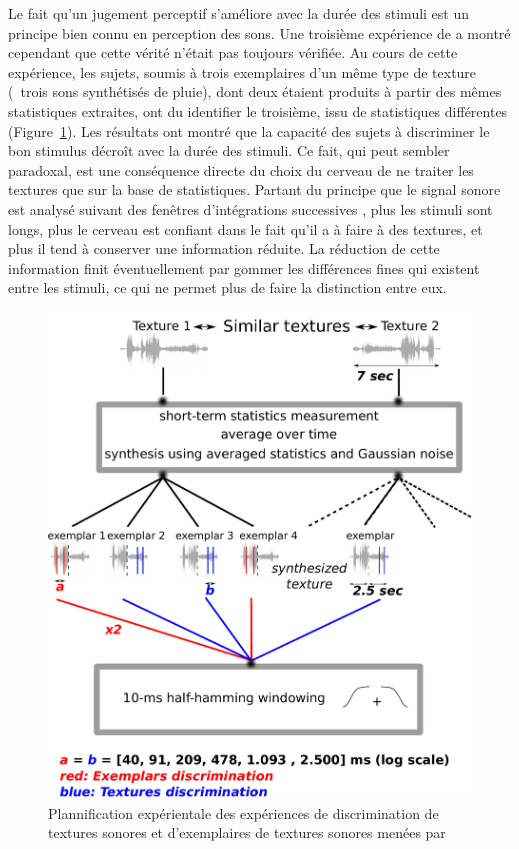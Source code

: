 Le fait qu'un jugement perceptif s'améliore avec la durée des stimuli est un principe bien connu en perception des sons\citep{moore1973frequency}. Une troisième expérience de \citep{mcdermott2013summary} a montré cependant que cette vérité n'était pas toujours vérifiée. Au cours de cette expérience, les sujets, soumis à trois exemplaires d'un même type de texture (\eg~trois sons synthétisés de pluie), dont deux étaient produits à partir des mêmes statistiques extraites, ont du identifier le troisième, issu de statistiques différentes (Figure~\ref{fig:textureMcder}). Les résultats ont montré que la capacité des sujets à discriminer le bon stimulus décroît avec la durée des stimuli. Ce fait, qui peut sembler paradoxal, est une conséquence directe du choix du cerveau de ne traiter les textures que sur la base de statistiques. Partant du principe que le signal sonore est analysé suivant des fenêtres d'intégrations successives \citep{yabe1998temporal,poeppel2003analysis}, plus les stimuli sont longs, plus le cerveau est confiant dans le fait qu'il a à faire à des textures, et plus il tend à conserver une information réduite. La réduction de cette information finit éventuellement par gommer les différences fines qui existent entre les stimuli, ce qui ne permet plus de faire la distinction entre eux.


\begin{figure}[t]
        \myfloatalign
        \includegraphics[width=.8\linewidth]{gfx/mcder}
        \caption[Plannification expérimentale de l'expérience de discrimination de textures sonores et d'exemplaires de textures sonores]{Plannification expérientale des expériences de discrimination de textures sonores et d'exemplaires de textures sonores menées par \citep{mcdermott2013summary}}\label{fig:textureMcder}
\end{figure}


